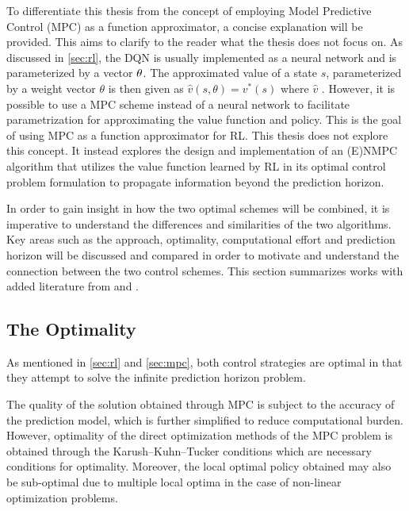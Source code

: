 To differentiate this thesis from the concept of employing Model Predictive Control (MPC) as a function approximator, a concise explanation will be provided. This aims to clarify to the reader what the thesis does not focus on. As discussed in \autoref{sec:rl}, the DQN is usually implemented as a neural network and is parameterized by a vector $\bold{\theta}$. The approximated value of a state $s$, parameterized by a weight vector  $\theta$ is then given as $ \hat{v}(s,\theta) = v^*(s)$ where $\hat{v}$ \cite{lubbersAutonomousGreenhouseClimate2023}. However, it is possible to use a MPC scheme instead of a neural network to facilitate parametrization for approximating the value function and policy. This is the goal of using MPC as a function approximator for RL. This thesis does not explore this concept. It instead explores the design and implementation of an (E)NMPC algorithm that utilizes the value function learned by RL in its optimal control problem formulation to propagate information beyond the prediction horizon. 

In order to gain insight in how the two optimal schemes will be combined, it is imperative to understand the differences and similarities of the two algorithms. Key areas such as the approach, optimality, computational effort and prediction horizon will be discussed and compared in order to motivate and understand the connection between the two control schemes. This section summarizes \cite{arroyoReinforcedModelPredictive2022} works with added literature from \cite{bertsekasNewtonMethodReinforcement2022} and \cite{linReinforcementLearningBasedModel2023}.

\subsection{The Optimality}
 As mentioned in \autoref{sec:rl} and \autoref{sec:mpc}, both control strategies are optimal in that they attempt to solve the infinite prediction horizon problem.

The quality of the solution obtained through MPC is subject to the accuracy of the prediction model, which is further simplified to reduce computational burden. However, optimality of the direct optimization methods of the MPC problem is obtained through the Karush–Kuhn–Tucker conditions which are necessary conditions for optimality. Moreover, the local optimal policy obtained may also be sub-optimal due to multiple local optima in the case of non-linear optimization problems.

